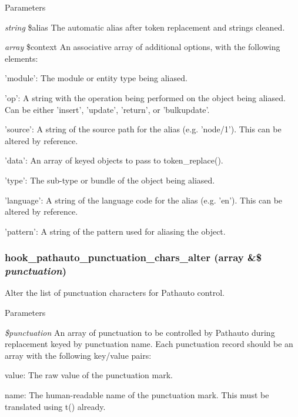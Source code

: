 \begin{DoxyParams}{Parameters}
\item[{\em string}]\$alias The automatic alias after token replacement and strings cleaned. \item[{\em array}]\$context An associative array of additional options, with the following elements:
\begin{DoxyItemize}
\item 'module': The module or entity type being aliased.
\item 'op': A string with the operation being performed on the object being aliased. Can be either 'insert', 'update', 'return', or 'bulkupdate'.
\item 'source': A string of the source path for the alias (e.g. 'node/1'). This can be altered by reference.
\item 'data': An array of keyed objects to pass to token\_\-replace().
\item 'type': The sub-\/type or bundle of the object being aliased.
\item 'language': A string of the language code for the alias (e.g. 'en'). This can be altered by reference.
\item 'pattern': A string of the pattern used for aliasing the object. 
\end{DoxyItemize}\end{DoxyParams}
\hypertarget{pathauto_8api_8php_a9b3ef2a8def13dc74ca8ecffb2c7193c}{
\subsubsection[{hook\_\-pathauto\_\-punctuation\_\-chars\_\-alter}]{\setlength{\rightskip}{0pt plus 5cm}hook\_\-pathauto\_\-punctuation\_\-chars\_\-alter (array \&\$ {\em punctuation})}}
\label{pathauto_8api_8php_a9b3ef2a8def13dc74ca8ecffb2c7193c}
Alter the list of punctuation characters for Pathauto control.


\begin{DoxyParams}{Parameters}
\item[{\em \$punctuation}]An array of punctuation to be controlled by Pathauto during replacement keyed by punctuation name. Each punctuation record should be an array with the following key/value pairs:
\begin{DoxyItemize}
\item value: The raw value of the punctuation mark.
\item name: The human-\/readable name of the punctuation mark. This must be translated using t() already. 
\end{DoxyItemize}\end{DoxyParams}
